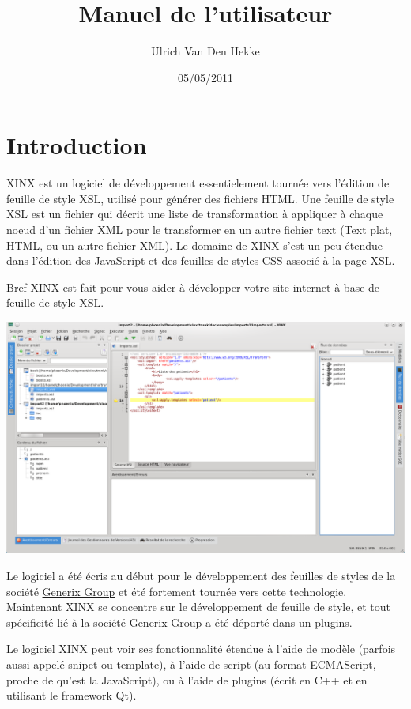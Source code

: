 \documentclass[a4paper,10pt,twoside]{book}
\author{Ulrich Van Den Hekke}
\date{05/05/2011}
\title{Manuel de l'utilisateur}
\begin{document}
  
\maketitle

\tableofcontents {}

\chapter{Introduction}

XINX est un logiciel de développement essentielement tournée vers l'édition de feuille de style XSL, utilisé pour générer des fichiers HTML. 
Une feuille de style XSL est un fichier qui décrit une liste de transformation à appliquer à chaque noeud d'un fichier XML pour le transformer en un autre fichier text (Text plat, HTML, ou un autre fichier XML). Le domaine de XINX s'est un peu étendue dans l'édition des JavaScript et des feuilles de styles CSS associé à la page XSL.

Bref XINX est fait pour vous aider à développer votre site internet à base de feuille de style XSL.

\begin{center}
 \includegraphics[width=\textwidth]{./mainform.png}
\end{center}

Le logiciel a été écris au début pour le développement des feuilles de styles de la société \href{http://www.generixgroup.com/}{Generix Group} et été fortement tournée vers cette technologie. Maintenant XINX se concentre sur le développement de feuille de style, et tout spécificité lié à la société Generix Group a été déporté dans un plugins.

Le logiciel XINX peut voir ses fonctionnalité étendue à l'aide de modèle (parfois aussi appelé snipet ou template), à l'aide de script (au format ECMAScript, proche de qu'est la JavaScript), ou à l'aide de plugins (écrit en C++ et en utilisant le framework Qt).
\end{document}
